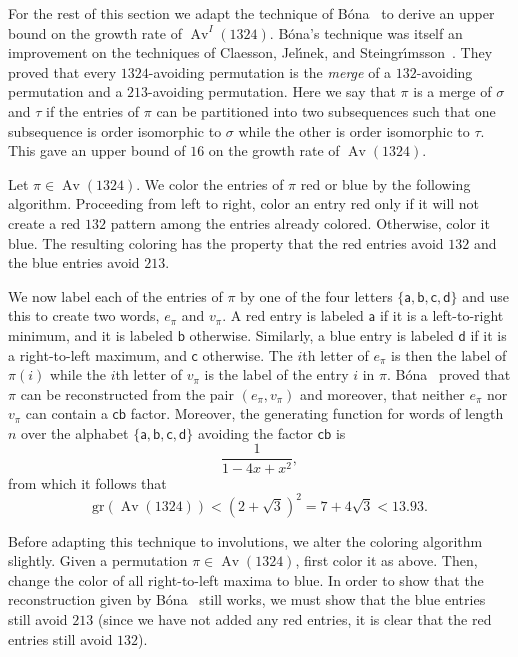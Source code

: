 \documentclass[10pt]{article}
\theoremstyle{plain}
\newcommand{\Av}{\operatorname{Av}}
\newcommand{\gr}{\mathrm{gr}}
\renewcommand{\a}{\mathsf{a}}
\renewcommand{\b}{\mathsf{b}}
\renewcommand{\c}{\mathsf{c}}
\renewcommand{\d}{\mathsf{d}}
\begin{document}
For the rest of this section we adapt the technique of B\'ona~\cite{bona:a-new-upper-bou:} to derive an upper bound on the growth rate of $\Av^I(1324)$. B\'ona's technique was itself an improvement on the techniques of Claesson, Jel\'{\i}nek, and Steingr\'{\i}msson~\cite{claesson:upper-bounds-fo:}. They proved that every $1324$-avoiding permutation is the \emph{merge} of a $132$-avoiding permutation and a $213$-avoiding permutation. Here we say that $\pi$ is a merge of $\sigma$ and $\tau$ if the entries of $\pi$ can be partitioned into two subsequences such that one subsequence is order isomorphic to $\sigma$ while the other is order isomorphic to $\tau$. This gave an upper bound of $16$ on the growth rate of $\Av(1324)$.

Let $\pi \in \Av(1324)$. We color the entries of $\pi$ red or blue by the following algorithm. Proceeding from left to right, color an entry red only if it will not create a red $132$ pattern among the entries already colored. Otherwise, color it blue. The resulting coloring has the property that the red entries avoid $132$ and the blue entries avoid $213$. %

We now label each of the entries of $\pi$ by one of the four letters $\{\a,\b,\c,\d\}$ and use this to create two words, $e_\pi$ and $v_\pi$. A red entry is labeled $\a$ if it is a left-to-right minimum, and it is labeled $\b$ otherwise. Similarly, a blue entry is labeled $\d$ if it is a right-to-left maximum, and $\c$ otherwise. The $i$th letter of $e_\pi$ is then the label of $\pi(i)$ while the $i$th letter of $v_\pi$ is the label of the entry $i$ in $\pi$. B\'ona~\cite{bona:a-new-upper-bou:} proved that $\pi$ can be reconstructed from the pair $(e_\pi,v_\pi)$ and moreover, that neither $e_\pi$ nor $v_\pi$ can contain a $\c\b$ factor. Moreover, the generating function for words of length $n$ over the alphabet $\{\a,\b,\c,\d\}$ avoiding the factor $\c\b$ is
\[
	\frac{1}{1-4x+x^2},
\]
from which it follows that
\[
	\gr(\Av(1324))<\left(2+\sqrt{3}\right)^2=7+4\sqrt{3} < 13.93.
\]

Before adapting this technique to involutions, we alter the coloring algorithm slightly. Given a permutation $\pi \in \Av(1324)$, first color it as above. Then, change the color of all right-to-left maxima to blue. In order to show that the reconstruction given by B\'ona~\cite{bona:a-new-upper-bou:} still works, we must show that the blue entries still avoid $213$ (since we have not added any red entries, it is clear that the red entries still avoid $132$).
\end{document}
